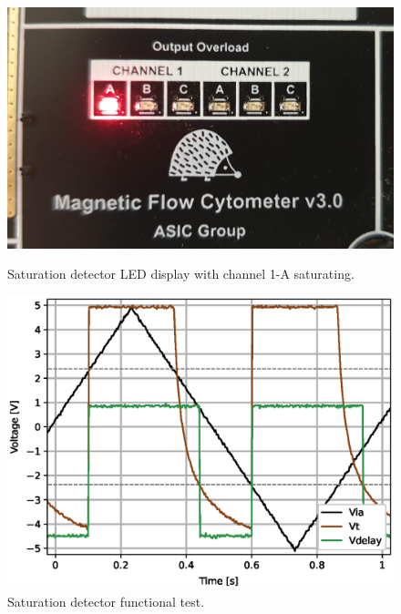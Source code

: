 
\begin{figure}[!ht]
    \centering
    \begin{minipage}{0.45\textwidth}
        \centering
        \includegraphics[width=\textwidth]{images/chapter_4/channel/sat_leds.png}
        \caption{Saturation detector LED display with channel 1-A saturating.}
        \label{figure:sat-leds}
    \end{minipage}\hfill
    \begin{minipage}{0.45\textwidth}
        \centering
        \includegraphics[width=\textwidth]{images/chapter_4/channel/sat_ex.eps}
        \caption{Saturation detector functional test.}
        \label{figure:sat-ex}
    \end{minipage}
\end{figure}

